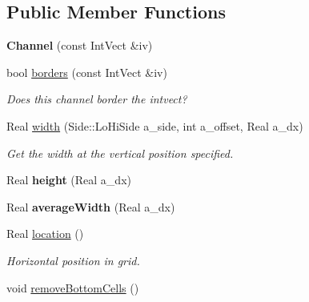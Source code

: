 \subsection*{Public Member Functions}
\begin{DoxyCompactItemize}
\item 
\hypertarget{class_channel_a80cbe21d69e3b524a126b5a0665ecffc}{{\bfseries Channel} (const Int\-Vect \&iv)}\label{class_channel_a80cbe21d69e3b524a126b5a0665ecffc}

\item 
\hypertarget{class_channel_a7de646c5752623df873facb0172ceb25}{bool \hyperlink{class_channel_a7de646c5752623df873facb0172ceb25}{borders} (const Int\-Vect \&iv)}\label{class_channel_a7de646c5752623df873facb0172ceb25}

\begin{DoxyCompactList}\small\item\em Does this channel border the intvect? \end{DoxyCompactList}\item 
\hypertarget{class_channel_af98ac8c6c72edc3b8591bd0e043a2aa2}{Real \hyperlink{class_channel_af98ac8c6c72edc3b8591bd0e043a2aa2}{width} (Side\-::\-Lo\-Hi\-Side a\-\_\-side, int a\-\_\-offset, Real a\-\_\-dx)}\label{class_channel_af98ac8c6c72edc3b8591bd0e043a2aa2}

\begin{DoxyCompactList}\small\item\em Get the width at the vertical position specified. \end{DoxyCompactList}\item 
\hypertarget{class_channel_ab65c9b664c6772a0dd9d08cc0215030c}{Real {\bfseries height} (Real a\-\_\-dx)}\label{class_channel_ab65c9b664c6772a0dd9d08cc0215030c}

\item 
\hypertarget{class_channel_a69386c5177bdc4e2cc986e32e620e3b0}{Real {\bfseries average\-Width} (Real a\-\_\-dx)}\label{class_channel_a69386c5177bdc4e2cc986e32e620e3b0}

\item 
Real \hyperlink{class_channel_abaeb092cb3b9705a69f6c1bb26d50aa4}{location} ()
\begin{DoxyCompactList}\small\item\em Horizontal position in grid. \end{DoxyCompactList}\item 
\hypertarget{class_channel_a4c6e4cec9b33ddbdbeade8787c3e80b6}{void \hyperlink{class_channel_a4c6e4cec9b33ddbdbeade8787c3e80b6}{remove\-Bottom\-Cells} ()}\label{class_channel_a4c6e4cec9b33ddbdbeade8787c3e80b6}


\end{DoxyCompactItemize}
